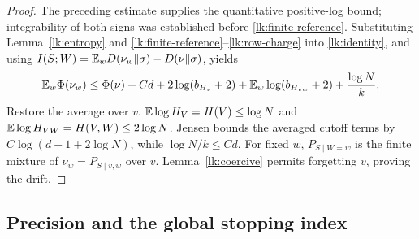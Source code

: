 \begin{proof}
The preceding estimate supplies the quantitative positive-log bound;
integrability of both signs was established before
\eqref{lk:finite-reference}. Substituting
Lemma~\ref{lk:entropy} and
\eqref{lk:finite-reference}--\eqref{lk:row-charge} into
\eqref{lk:identity}, and using
\(I(S;W)=\mathbb E_wD(\nu_w\|\sigma)-D(\nu\|\sigma)\), yields
\[
 \mathbb E_w\Phi(\nu_w)\le\Phi(\nu)+Cd+2\log(b_{H_v}+2)
       +\mathbb E_w\log(b_{H_{vw}}+2)+\frac{\log N}{k}.
\]
Restore the average over \(v\).
\(\mathbb E\log H_V=H(V)\le\log N\) and
\(\mathbb E\log H_{VW}=H(V,W)\le2\log N\). Jensen bounds the averaged
cutoff terms by \(C\log(d+1+2\log N)\), while
\(\log N/k\le Cd\). For fixed \(w\), \(P_{S\mid W=w}\) is the
finite mixture of \(\nu_w=P_{S\mid v,w}\) over \(v\).
Lemma~\ref{lk:coercive} permits forgetting \(v\), proving the drift.
\end{proof}

\subsection{Precision and the global stopping index}

